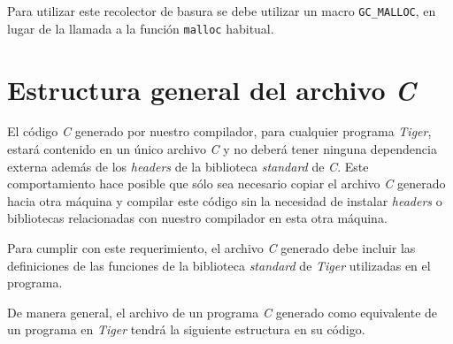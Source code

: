 \documentclass{article}
\begin{document}
Para utilizar este recolector de basura se debe utilizar un macro
\texttt{GC\_MALLOC}, en lugar de la llamada a la función \texttt{malloc}
habitual.

\section{Estructura general del archivo \emph{C}}

El código \emph{C} generado por nuestro compilador, para cualquier programa
\emph{Tiger}, estará contenido en un único archivo \emph{C} y no deberá tener
ninguna dependencia externa además de los \emph{headers} de la biblioteca
\emph{standard} de \emph{C}. Este comportamiento hace posible que sólo sea
necesario copiar el archivo \emph{C} generado hacia otra máquina y compilar
este código sin la necesidad de instalar \emph{headers} o bibliotecas
relacionadas con nuestro compilador en esta otra máquina.

Para cumplir con este requerimiento, el archivo \emph{C} generado debe incluir
las definiciones de las funciones de la biblioteca \emph{standard} de
\emph{Tiger} utilizadas en el programa.

De manera general, el archivo de un programa \textit{C} generado como
equivalente de un programa en \textit{Tiger} tendrá la siguiente estructura en
su código.
\end{document}
